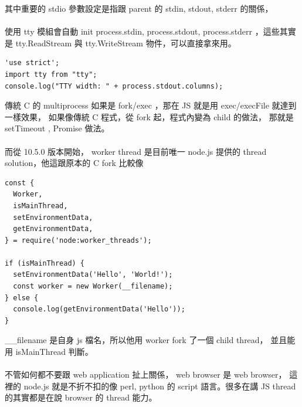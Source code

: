   其中重要的 stdio 參數設定是指跟 parent 的 stdin, stdout, stderr 的關係，
  \\\\
  使用 tty 模組會自動 init process.stdin, process.stdout, process.stderr
  ，這些其實是 tty.ReadStream 與 tty.WriteStream 物件，可以直接拿來用。
  \begin{verbatim}
'use strict';
import tty from "tty";
console.log("TTY width: " + process.stdout.columns);
  \end{verbatim}
  傳統 C 的 multiprocess 如果是 fork/exec ，那在 JS 就是用 exec/execFile
  就達到一樣效果， 如果像傳統 C 程式，從 fork 起，程式內變為 child 的做法，
  那就是 setTimeout , Promise 做法。
  \\\\
  而從 10.5.0 版本開始， worker thread 是目前唯一 node.js 提供的 thread
  solution，他這跟原本的 C fork 比較像
  \begin{verbatim}
const {
  Worker,
  isMainThread,
  setEnvironmentData,
  getEnvironmentData,
} = require('node:worker_threads');

if (isMainThread) {
  setEnvironmentData('Hello', 'World!');
  const worker = new Worker(__filename);
} else {
  console.log(getEnvironmentData('Hello'));
}
  \end{verbatim}
  \_\_filename 是自身 js 檔名，所以他用 worker fork 了一個 child thread，
  並且能用 isMainThread 判斷。
  \\\\
  不管如何都不要跟 web application 扯上關係， web browser 是 web browser，
  這裡的 node.js 就是不折不扣的像 perl, python 的 script 語言。很多在講
  JS thread 的其實都是在說 browser 的 thread 能力。

